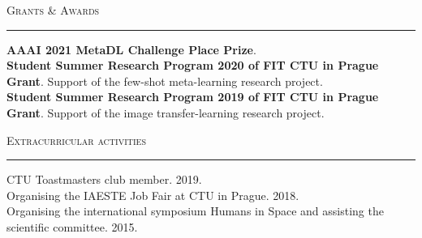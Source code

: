 \documentclass[10pt]{article}
\begin{document}
\begin{Large}
    \textsc{Grants \& Awards}
    \vspace{0.4em}
    \hrule
    \vspace{0.4em}
\end{Large}
\begin{normalsize}
    \textbf{AAAI 2021 MetaDL Challenge  Place Prize}.\\[0.2em]
    \textbf{Student Summer Research Program 2020 of FIT CTU in Prague Grant}. Support of the few-shot meta-learning research project.\\[0.2em]
    \textbf{Student Summer Research Program 2019 of FIT CTU in Prague Grant}. Support of the image transfer-learning research project.
\end{normalsize}
\vspace{20pt}


\begin{Large}
    \textsc{Extracurricular activities}
    \vspace{0.4em}
    \hrule
    \vspace{0.4em}
\end{Large}

\begin{normalsize}
    CTU Toastmasters club member. 2019.\\[0.2em]
    Organising the IAESTE Job Fair at CTU in Prague. 2018.\\[0.2em]
    Organising the international symposium Humans in Space and assisting the scientific committee. 2015.\\
\end{normalsize}

\end{document}
